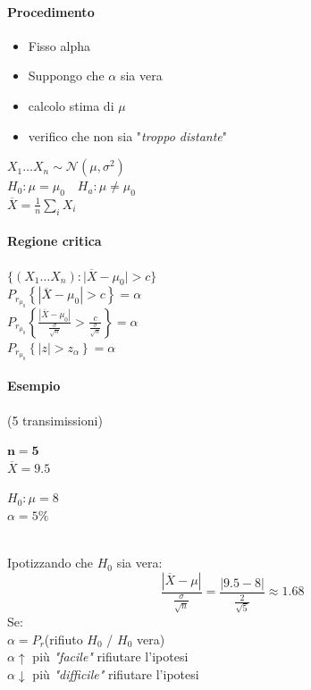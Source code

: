 \documentclass[]{article}
\begin{document}
    \paragraph{Procedimento}
    \begin{itemize}
        \item Fisso alpha
        \item Suppongo che $\alpha$ sia vera
        \item calcolo stima di $\mu$
        \item verifico che non sia "\textit{troppo distante}"
    \end{itemize}
    $X_1 \ldots X_n \sim \mathcal{N}(\mu, \sigma^2)$ \\
    $H_0 : \mu = \mu_0 \quad H_a : \mu \not = \mu_0$ \\
    $\overline{X} = \frac{1}{n} \sum_{i}^{} X_i $
    \paragraph{Regione critica}
    $\{ (X_1 \ldots X_n): \rvert \overline{X} - \mu_0 \rvert > c \}$ \\
    $P_{r_{\mu_0}} \left\{ | \overline{X} - \mu_0 | > c \right\} = \alpha$ \\
    $P_{r_{\mu_0}} \left\{ \frac{|\overline{X} - \mu_0|}{\frac{\sigma}{\sqrt{n}}} > \frac{c}{\frac{\sigma}{\sqrt{n}}} \right\} = \alpha$ \\
    $P_{r_{\mu_0}} \left\{ |z| > z_\alpha \right\} = \alpha$
    \paragraph{Esempio} (5 transimissioni) \\
    \begin{minipage}{0.45\textwidth}
        $\boldsymbol{n=5}$ \\
        $\overline{X} = 9.5$
    \end{minipage}
    \begin{minipage}{0.45\textwidth}
        $H_0 : \mu = 8$ \\
        $\alpha = 5\%$
    \end{minipage} \\[4ex]
    Ipotizzando che $H_0$ sia vera:
    \[ \frac{|\overline{X} - \mu|}{\frac{\sigma}{\sqrt{n}}} = \frac{|9.5 - 8|}{\frac{2}{\sqrt{5}}} \approx 1.68 \]
    Se: \\
    $\alpha = P_r$(rifiuto $H_0$ / $H_0$ vera) \\
    $\alpha \uparrow$ più \textit{"facile"} rifiutare l'ipotesi \\
    $\alpha \downarrow$ più \textit{"difficile"} rifiutare l'ipotesi
\end{document}
